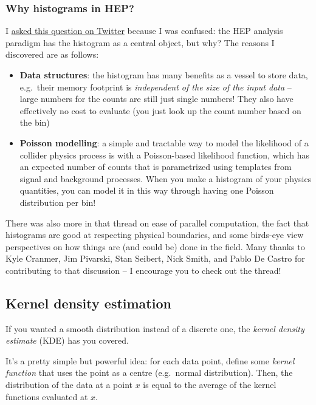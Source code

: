 \documentclass[
  11pt,
  numbers=noendperiod]{book}
\providecommand{\tightlist}{%
  \setlength{\itemsep}{0pt}\setlength{\parskip}{0pt}}\usepackage{longtable,booktabs,array}
\begin{document}
\hypertarget{sec-whyhist}{%
\subsubsection*{Why histograms in HEP?}\label{sec-whyhist}}

I
\href{https://twitter.com/phi_nate/status/1251124042012274693?s=20\&t=_miEUw-BGQwuWl1rsgyHuQ}{asked
this question on Twitter} because I was confused: the HEP analysis
paradigm has the histogram as a central object, but why? The reasons I
discovered are as follows:

\begin{itemize}
\tightlist
\item
  \textbf{Data structures}: the histogram has many benefits as a vessel
  to store data, e.g.~their memory footprint is \emph{independent of the
  size of the input data} -- large numbers for the counts are still just
  single numbers! They also have effectively no cost to evaluate (you
  just look up the count number based on the bin)
\item
  \textbf{Poisson modelling}: a simple and tractable way to model the
  likelihood of a collider physics process is with a Poisson-based
  likelihood function, which has an expected number of counts that is
  parametrized using templates from signal and background processes.
  When you make a histogram of your physics quantities, you can model it
  in this way through having one Poisson distribution per bin!
\end{itemize}

There was also more in that thread on ease of parallel computation, the
fact that histograms are good at respecting physical boundaries, and
some birds-eye view perspectives on how things are (and could be) done
in the field. Many thanks to Kyle Cranmer, Jim Pivarski, Stan Seibert,
Nick Smith, and Pablo De Castro for contributing to that discussion -- I
encourage you to check out the thread!

\hypertarget{sec-kde}{%
\subsection{Kernel density estimation}\label{sec-kde}}

If you wanted a smooth distribution instead of a discrete one, the
\emph{kernel density estimate} (KDE) has you covered.

It's a pretty simple but powerful idea: for each data point, define some
\emph{kernel function} that uses the point as a centre (e.g.~normal
distribution). Then, the distribution of the data at a point \(x\) is
equal to the average of the kernel functions evaluated at \(x\).
\end{document}
